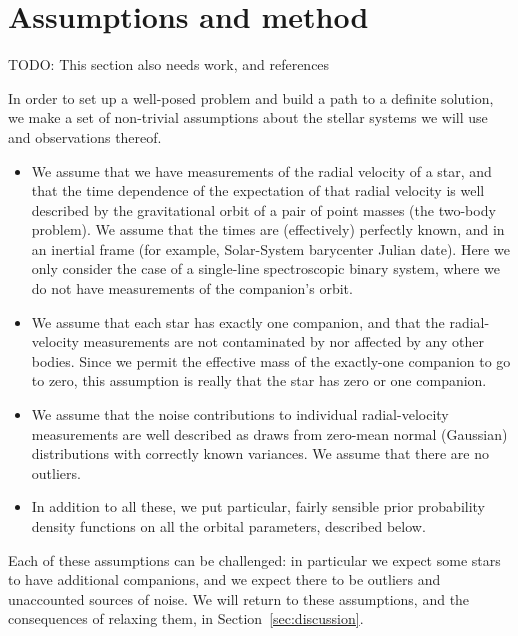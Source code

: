 \documentclass[manuscript, letterpaper]{aastex6}
\newcommand{\sectionname}{Section}
\newcommand{\todo}[1]{{\color{red}TODO: #1}}
\begin{document}
\section{Assumptions and method} \label{sec:method}

\todo{This section also needs work, and references}

In order to set up a well-posed problem and build a path to a
definite solution, we make a set of non-trivial assumptions about the
stellar systems we will use and observations thereof.
\begin{itemize}\itemsep0ex
\item We assume that we have measurements of the radial velocity of a
  star, and that the time dependence of the expectation of that radial
  velocity is well described by the gravitational orbit of a pair of
  point masses (the two-body problem). We assume that the times are
  (effectively) perfectly known, and in an inertial frame (for
  example, Solar-System barycenter Julian date).
  Here we only consider the case of a single-line spectroscopic binary system,
  where we do not have measurements of the companion's orbit.
\item We assume that each star has exactly one companion, and that the
  radial-velocity measurements are not contaminated by nor affected by
  any other bodies. Since we permit the effective mass of the
  exactly-one companion to go to zero, this assumption is really that
  the star has zero or one companion.
\item We assume that the noise contributions to individual
  radial-velocity measurements are well described as draws from
  zero-mean normal (Gaussian) distributions with correctly known
  variances. We assume that there are no outliers.
\item In addition to all these, we put particular, fairly sensible
  prior probability density functions on all the orbital parameters,
  described below.
\end{itemize}
Each of these assumptions can be challenged: in particular we expect some stars
to have additional companions, and we expect there to be outliers and
unaccounted sources of noise.
We will return to these assumptions, and the consequences of relaxing them, in
\sectionname~\ref{sec:discussion}.
\end{document}
